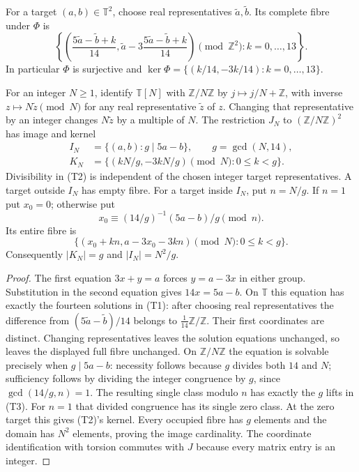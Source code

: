 \begin{theorem}
\label{thm:ns-torus-fibres}
For a target $(a,b)\in\mathbb T^2$, choose real representatives
$\widetilde a,\widetilde b$. Its complete fibre under $\Phi$ is
\[
 \left\{\left(
 \frac{5\widetilde a-\widetilde b+k}{14},
 \widetilde a-3\frac{5\widetilde a-\widetilde b+k}{14}
 \right)\pmod{\mathbb Z^2}:k=0,\ldots,13\right\}.       \tag{T1}
\]
In particular $\Phi$ is surjective and
$\ker\Phi=\{(k/14,-3k/14):k=0,\ldots,13\}$.

For an integer $N\geq1$, identify $\mathbb T[N]$ with
$\mathbb Z/N\mathbb Z$ by $j\mapsto j/N+\mathbb Z$, with inverse
$z\mapsto N\widetilde z\pmod N$ for any real representative
$\widetilde z$ of $z$. Changing that representative by an integer
changes $N\widetilde z$ by a multiple of $N$.
The restriction $J_N$ to
$(\mathbb Z/N\mathbb Z)^2$ has image and kernel
\[
 \begin{split}
 I_N&=\{(a,b):g\mid5a-b\},\qquad g=\gcd(N,14),\\
 K_N&=\{(kN/g,-3kN/g)\pmod N:0\leq k<g\}.
 \end{split}                                                    \tag{T2}
\]
Divisibility in (T2) is independent of the chosen integer target
representatives. A target outside $I_N$ has empty fibre. For a target
inside $I_N$, put $n=N/g$. If $n=1$ put $x_0=0$; otherwise put
\[
 x_0\equiv (14/g)^{-1}(5a-b)/g\pmod n.
\]
Its entire fibre is
\[
 \{(x_0+kn,a-3x_0-3kn)\pmod N:0\leq k<g\}.           \tag{T3}
\]
Consequently $|K_N|=g$ and $|I_N|=N^2/g$.
\end{theorem}
\begin{proof}
The first equation $3x+y=a$ forces $y=a-3x$ in either group.
Substitution in the second equation gives $14x=5a-b$.
On $\mathbb T$ this equation has exactly the fourteen solutions in
(T1): after choosing real representatives the difference from
$(5\widetilde a-\widetilde b)/14$ belongs to
$\frac1{14}\mathbb Z/\mathbb Z$. Their first coordinates are distinct.
Changing representatives leaves the solution equations unchanged, so
leaves the displayed full fibre unchanged. On $\mathbb Z/N\mathbb Z$
the equation is solvable precisely when $g\mid5a-b$: necessity follows
because $g$ divides both $14$ and $N$; sufficiency follows by dividing
the integer congruence by $g$, since $\gcd(14/g,n)=1$.
The resulting single class modulo $n$ has exactly the $g$ lifts in
(T3). For $n=1$ that divided congruence has its single zero class.
At the zero target this gives (T2)'s kernel. Every occupied fibre has
$g$ elements and the domain has $N^2$ elements, proving the image
cardinality. The coordinate identification with torsion commutes with
$J$ because every matrix entry is an integer.
\end{proof}


